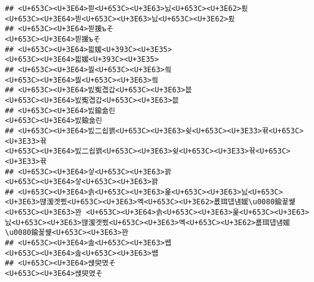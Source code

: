 \documentclass[]{article}
\begin{document}
\begin{verbatim}
## <U+653C><U+3E64>븯<U+653C><U+3E63>닔<U+653C><U+3E62>룄                                                                                                                                                     <U+653C><U+3E64>븯<U+653C><U+3E63>닔<U+653C><U+3E62>룄
## <U+653C><U+3E64>븯援ъそ                                                                                                                                                                                         <U+653C><U+3E64>븯援ъそ
## <U+653C><U+3E64>븳媛<U+393C><U+3E35>                                                                                                                                                                             <U+653C><U+3E64>븳媛<U+393C><U+3E35>
## <U+653C><U+3E64>븷<U+653C><U+3E63>씤                                                                                                                                                                             <U+653C><U+3E64>븷<U+653C><U+3E63>씤
## <U+653C><U+3E64>빐寃곕갑<U+653C><U+3E63>븞                                                                                                                                                                 <U+653C><U+3E64>빐寃곕갑<U+653C><U+3E63>븞
## <U+653C><U+3E64>빐鍮숆린                                                                                                                                                                                         <U+653C><U+3E64>빐鍮숆린
## <U+653C><U+3E64>빐二쇱꽭<U+653C><U+3E63>슂<U+653C><U+3E33>뀪<U+653C><U+3E33>뀪                                                                                                                 <U+653C><U+3E64>빐二쇱꽭<U+653C><U+3E63>슂<U+653C><U+3E33>뀪<U+653C><U+3E33>뀪
## <U+653C><U+3E64>샇<U+653C><U+3E63>꽑                                                                                                                                                                             <U+653C><U+3E64>샇<U+653C><U+3E63>꽑
## <U+653C><U+3E64>솕<U+653C><U+3E63>옱<U+653C><U+3E63>닔<U+653C><U+3E63>떊湲곗삤<U+653C><U+3E63>옉<U+653C><U+3E62>룞珥덉냼媛\u0080鍮꾩썙<U+653C><U+3E63>꽌 <U+653C><U+3E64>솕<U+653C><U+3E63>옱<U+653C><U+3E63>닔<U+653C><U+3E63>떊湲곗삤<U+653C><U+3E63>옉<U+653C><U+3E62>룞珥덉냼媛\u0080鍮꾩썙<U+653C><U+3E63>꽌
## <U+653C><U+3E64>솚<U+653C><U+3E63>썝                                                                                                                                                                             <U+653C><U+3E64>솚<U+653C><U+3E63>썝
## <U+653C><U+3E64>썑臾몄そ                                                                                                                                                                                         <U+653C><U+3E64>썑臾몄そ

\end{verbatim}
\end{document}
